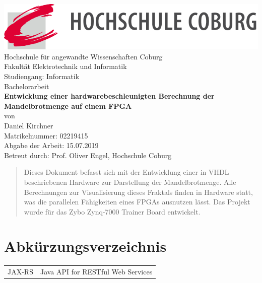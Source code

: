 \documentclass[a4paper,12pt,onesided]{report}
\begin{document}
\begin{titlepage}
	\centering
	\includegraphics[width=14.9cm]{img/logo}\\

	\fontsize{18}{20}\selectfont
	Hochschule für angewandte Wissenschaften Coburg\\[.1cm]
	Fakultät Elektrotechnik und Informatik\\[1.2cm]
	Studiengang: Informatik\\
	Bachelorarbeit\\[1.2cm]
	\fontsize{21}{23}\selectfont
	\textbf{Entwicklung einer hardwarebeschleunigten Berechnung der 
	Mandelbrotmenge auf einem FPGA}\\[1cm]
	\fontsize{18}{20}\selectfont
	von\\[1.2cm]
	Daniel Kirchner\\
	Matrikelnummer: 02219415\\[1.2cm]
	Abgabe der Arbeit: 15.07.2019\\[1.2cm]

	Betreut durch: Prof. Oliver Engel, Hochschule Coburg
\end{titlepage}

\begin{abstract}
	Dieses Dokument befasst sich mit der Entwicklung einer in VHDL beschriebenen Hardware zur Darstellung
	der Mandelbrotmenge.
	Alle Berechnungen zur Visualisierung dieses Fraktals finden in Hardware statt, was die parallelen Fähigkeiten
	eines FPGAs ausnutzen lässt.
	Das Projekt wurde für das Zybo Zynq-7000 Trainer Board entwickelt.
\end{abstract}

{
  \setlength{\cftbeforechapskip}{-.5ex}
  \tableofcontents
}

\newpage
\listoffigures
{}

\newpage
\lstlistoflistings
{}

\newpage
\section*{Abkürzungsverzeichnis}
\begin{tabular}{ll}
  JAX-RS&Java API for RESTful Web Services\\
\end{tabular}
\end{document}
